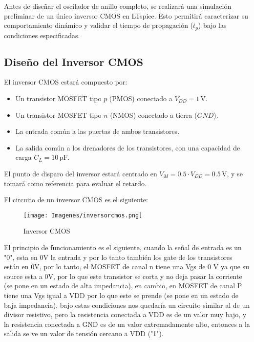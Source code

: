 \documentclass[11pt, a4paper]{article}
\begin{document}
Antes de diseñar el oscilador de anillo completo, se realizará una simulación preliminar de un único inversor CMOS en LTspice. Esto permitirá caracterizar su comportamiento dinámico y validar el tiempo de propagación (\( t_p \)) bajo las condiciones especificadas.

\subsection{Diseño del Inversor CMOS}

El inversor CMOS estará compuesto por:
\begin{itemize}
    \item Un transistor MOSFET tipo \( p \) (PMOS) conectado a \( V_{DD} = 1 \, \mathrm{V} \).
    \item Un transistor MOSFET tipo \( n \) (NMOS) conectado a tierra (\( GND \)).
    \item La entrada común a las puertas de ambos transistores.
    \item La salida común a los drenadores de los transistores, con una capacidad de carga \( C_L = 10 \, \mathrm{pF} \).
\end{itemize}

El punto de disparo del inversor estará centrado en \( V_M = 0.5 \cdot V_{DD} = 0.5 \, \mathrm{V} \), y se tomará como referencia para evaluar el retardo.

El circuito de un inversor CMOS es el siguiente:



   \begin{figure}[H]
    \centering
    \texttt{[image: Imagenes/inversorcmos.png]}
    \caption{Inversor CMOS}
    \label{fig:inversorcmos}
    \end{figure}




El principio de funcionamiento es el siguiente, cuando la señal de entrada es un "0", esta en 0V la entrada y por lo tanto también los gate de los transistores están en 0V, por lo tanto, el MOSFET de canal n tiene una Vgs de 0 V ya que su source esta a 0V, por lo que este transistor se corta y no deja pasar la corriente (se pone en un estado de alta impedancia), en cambio, en MOSFET de canal P tiene una Vgs igual a VDD por lo que este se prende (se pone en un estado de baja impedancia), bajo estas condiciones nos quedaría un circuito similar al de un divisor resistivo, pero la resistencia conectada a VDD es de un valor muy bajo, y la resistencia conectada a GND es de un valor extremadamente alto, entonces a la salida se ve un valor de tensión cercano a VDD ("1").
\end{document}
